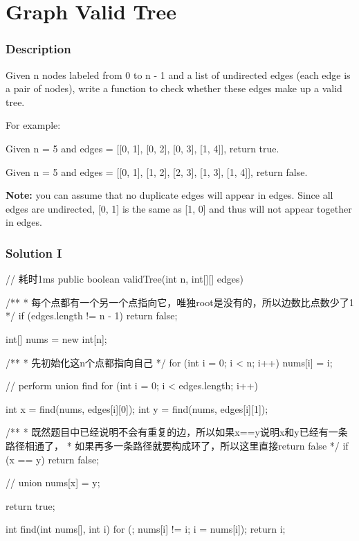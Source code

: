 \newpage

\section{Graph Valid Tree} %

\subsubsection{Description}

Given n nodes labeled from 0 to n - 1 and a list of undirected edges (each edge is a pair of nodes), write a function to check whether these edges make up a valid tree.

For example:

Given n = 5 and edges = [[0, 1], [0, 2], [0, 3], [1, 4]], return true.

Given n = 5 and edges = [[0, 1], [1, 2], [2, 3], [1, 3], [1, 4]], return false.

\textbf{Note:} you can assume that no duplicate edges will appear in edges. Since all edges are undirected, [0, 1] is the same as [1, 0] and thus will not appear together in edges.

\subsubsection{Solution I}

\begin{Code}
// 耗时1ms
public boolean validTree(int n, int[][] edges) {
    /**
     * 每个点都有一个另一个点指向它，唯独root是没有的，所以边数比点数少了1
     */
    if (edges.length != n - 1) {
        return false;
    }

    int[] nums = new int[n];

    /**
     * 先初始化这n个点都指向自己
     */
    for (int i = 0; i < n; i++) {
        nums[i] = i;
    }

    // perform union find
    for (int i = 0; i < edges.length; i++) {
        int x = find(nums, edges[i][0]);
        int y = find(nums, edges[i][1]);

        /**
         * 既然题目中已经说明不会有重复的边，所以如果x==y说明x和y已经有一条路径相通了，
         * 如果再多一条路径就要构成环了，所以这里直接return false
         */
        if (x == y) return false;

        // union
        nums[x] = y;
    }

    return true;
}

int find(int nums[], int i) {
    for (; nums[i] != i; i = nums[i]);
    return i;
}
\end{Code}

